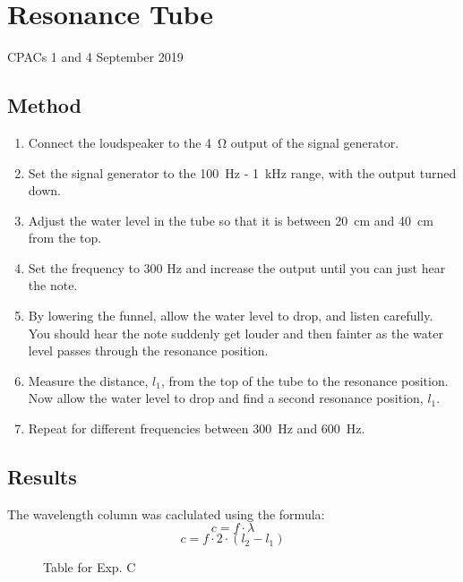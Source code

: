 \section{Resonance Tube}
CPACs 1 and 4
\hfill
{} September 2019

\subsection{Method}
\begin{enumerate}
  \item Connect the loudspeaker to the \SI{4}{\ohm} output of the signal generator.
  \item Set the signal generator to the \SI{100}{\hertz} - \SI{1}{\kilo\hertz} range, with the output turned
down.
  \item Adjust the water level in the tube so that it is between \SI{20}{\centi\metre} and \SI{40}{\centi\metre} from the top.
  \item Set the frequency to 300 Hz and increase the output until you can just hear the note.
  \item By lowering the funnel, allow the water level to drop, and listen carefully. You should hear
the note suddenly get louder and then fainter as the water level passes through the
resonance position.
  \item Measure the distance, $l_1$, from the top of the tube to the resonance position. Now allow
the water level to drop and find a second resonance position, $l_1$.
  \item Repeat for different frequencies between \SI{300}{\hertz} and \SI{600}{\hertz}.
\end{enumerate}

\subsection{Results}
The wavelength column was caclulated using the formula:
\begin{equation*}
  c = f \cdot \lambda
\end{equation*}
\begin{equation*}
  c= f \cdot 2 \cdot (l_2-l_1)
\end{equation*}

\begin{figure}[H]
  \centering
  \caption{Table for Exp. C}
\end{figure}

